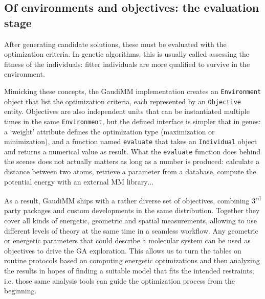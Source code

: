 


\subsection{Of environments and objectives: the evaluation stage}
After generating candidate solutions, these must be evaluated with the optimization criteria. In genetic algorithms, this is usually called assessing the fitness of the individuals: fitter individuals are more qualified to survive in the environment.

Mimicking these concepts, the GaudiMM implementation creates an \texttt{Environment} object that list the optimization criteria, each represented by an \texttt{Objective} entity. Objectives are also independent units that can be instantiated multiple times in the same \texttt{Environment}, but the defined interface is simpler that in genes: a ‘weight’ attribute defines the optimization type (maximization or minimization), and a function named \texttt{evaluate} that takes an \texttt{Individual} object and returns a numerical value as result. What the \texttt{evaluate} function does behind the scenes does not actually matters as long as a number is produced: calculate a distance between two atoms, retrieve a parameter from a database, compute the potential energy with an external MM library$ \ldots $

As a result, GaudiMM ships with a rather diverse set of objectives, combining 3\textsuperscript{rd} party packages and custom developments in the same distribution. Together they cover all kinds of energetic, geometric and spatial measurements, allowing to use different levels of theory at the same time in a seamless workflow. Any geometric or energetic parameters that could describe a molecular system can be used as objectives to drive the GA exploration. This allows us to turn the tables on routine protocols based on computing energetic optimizations and then analyzing the results in hopes of finding a suitable model that fits the intended restraints; i.e. those same analysis tools can guide the optimization process from the beginning.

